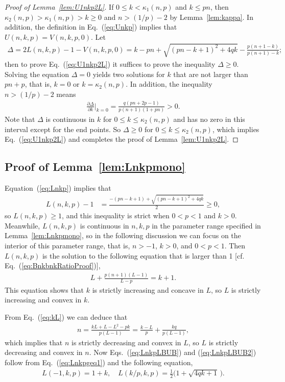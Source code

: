 \documentclass[aop]{imsart}
\theoremstyle{plain}
\theoremstyle{remark}
\newcommand{\1}{\operatorname{\uppercase\expandafter{\romannumeral1}}}
\newcommand{\2}{\operatorname{\uppercase\expandafter{\romannumeral2}}}
\newcommand{\3}{\operatorname{\uppercase\expandafter{\romannumeral3}}}
\newcommand{\4}{\operatorname{\uppercase\expandafter{\romannumeral4}}}
\newcommand{\5}{\operatorname{\uppercase\expandafter{\romannumeral5}}}
\newcommand{\6}{\operatorname{\uppercase\expandafter{\romannumeral6}}}
\newcommand{\7}{\operatorname{\uppercase\expandafter{\romannumeral7}}}
\newcommand{\8}{\operatorname{\uppercase\expandafter{\romannumeral8}}}
\newcommand{\9}{\operatorname{\uppercase\expandafter{\romannumeral9}}}
\newcommand{\eref}[1]{Eq.~\textup{(\ref{#1})}}
\newcommand{\Eref}[1]{Equation~\textup{(\ref{#1})}}
\newcommand{\eqsref}[2]{Eqs.~(\ref{#1}) and (\ref{#2})}
\newcommand{\lref}[1]{Lemma~\ref{#1}}
\begin{document}
\begin{appendix}
\begin{proof}[Proof of \lref{lem:U1nkp2L}]
	If  $0\leq k<\kappa_1(n,p)$ and $k\leq pn$,
	then $\kappa_2(n,p)> \kappa_1(n,p)> k\geq 0$ and  $n> (1/p)-2$ by \lref{lem:kappa}. In addition,
 the definition in \eref{eq:Unkp} implies that $U(n,k,p)=V(n,k,p,0)$.  Let 
	\begin{align}
	\Delta=2L(n,k,p)-1- V(n,k,p,0)=k-p n+\sqrt{(p n-k+1)^2+4q k}-\frac{p(n+1-k)}{p(n+1)-k};
	\end{align}
	then to prove \eref{eq:U1nkp2L} it suffices to prove the inequality $\Delta\geq 0$.  Solving the equation $\Delta=0$ yields two solutions for $k$ that are not larger than  $pn+p$, that is, $	k=0$ or $k=\kappa_2(n,p)$. 
In addition, the inequality 	$n> (1/p)-2$ means 
	\begin{align}
	\frac{\partial \Delta}{\partial k}\Big|_{k=0}=\frac{q (p n+2p -1)}{p(n+1)(1+p n)}>0.
	\end{align}
	Note that  $\Delta$ is continuous in $k$ for $0\leq k\leq \kappa_2(n,p)$ and has no zero in this interval except for the end points. 	  So $\Delta\geq 0$ for  $0\leq k\leq \kappa_2(n,p)$, which implies \eref{eq:U1nkp2L} and completes the proof of \lref{lem:U1nkp2L}. 
\end{proof}



\subsection{Proof of \lref{lem:Lnkpmono}}
\Eref{eq:Lnkp} implies that
\begin{align}\label{eq:Lnkpgeq1}
L(n,k,p)-1
&=\frac{-(p n-k+1)+\sqrt{(p n-k+1)^2+4q k}}{2} \geq 0,
\end{align}	
so  $L(n,k,p)\geq 1$, and this inequality is strict when $0<p<1$ and $k>0$. Meanwhile, $L(n,k,p)$ is continuous in $n,k,p$  in the parameter range specified in \lref{lem:Lnkpmono}, so in the following discussion we can focus on the interior of this parameter range, that is, $n>-1$, $k>0$, and $0<p<1$. Then  $L(n,k,p)$ is the solution to the following equation that is larger than 1 [cf. \eref{eq:BnkbnkRatioProof}],
	\begin{align}
	L+\frac{p(n+1)(L-1)}{L-p}=k+1. \label{eq:kL}
	\end{align} 
	This equation shows that $k$ is strictly increasing and concave in $L$, so $L$ is strictly increasing and convex in $k$.  	
	
	From \eref{eq:kL} we can deduce  that 
	\begin{align}
	n=\frac{k L+L-L^2-p k}{p(L-1)}=\frac{k-L}{p}+\frac{k q }{p(L-1)},
	\end{align}
	which implies that $n$ is strictly decreasing and convex in $L$, so $L$ is strictly decreasing and convex in $n$.  Now \eqsref{eq:LnkpLBUB}{eq:LnkpLBUB2} follow from \eref{eq:Lnkpgeq1} and the following  equation, 
	\begin{gather}
	L(-1,k,p)=1+k,\quad 
	L(k/p,k,p)=\frac{1}{2}\bigl(1+\sqrt{4q k+1}\,\bigr). 
	\end{gather}
	

\end{appendix}
\end{document}
